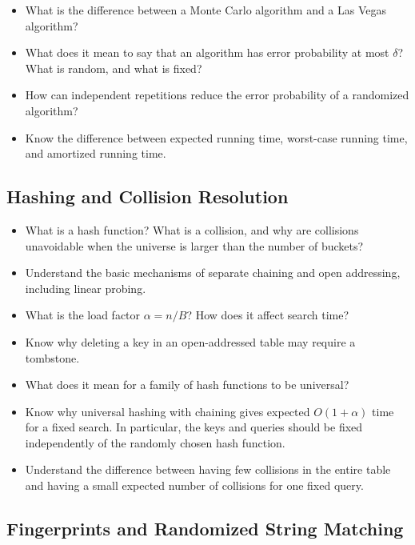 \documentclass[11 pt]{exam}
\begin{document}
	\begin{itemize}
		\item What is the difference between a Monte Carlo algorithm and a Las Vegas algorithm?
		\item What does it mean to say that an algorithm has error probability at most $\delta$? What is random, and what is fixed?
		\item How can independent repetitions reduce the error probability of a randomized algorithm?
		\item Know the difference between expected running time, worst-case running time, and amortized running time.
	\end{itemize}

	\subsection{Hashing and Collision Resolution}

	\begin{itemize}
		\item What is a hash function? What is a collision, and why are collisions unavoidable when the universe is larger than the number of buckets?
		\item Understand the basic mechanisms of separate chaining and open addressing, including linear probing.
		\item What is the load factor $\alpha=n/B$? How does it affect search time?
		\item Know why deleting a key in an open-addressed table may require a tombstone.
		\item What does it mean for a family of hash functions to be universal?
		\item Know why universal hashing with chaining gives expected $O(1+\alpha)$ time for a fixed search. In particular, the keys and queries should be fixed independently of the randomly chosen hash function.
		\item Understand the difference between having few collisions in the entire table and having a small expected number of collisions for one fixed query.
	\end{itemize}

	\subsection{Fingerprints and Randomized String Matching}
\end{document}

